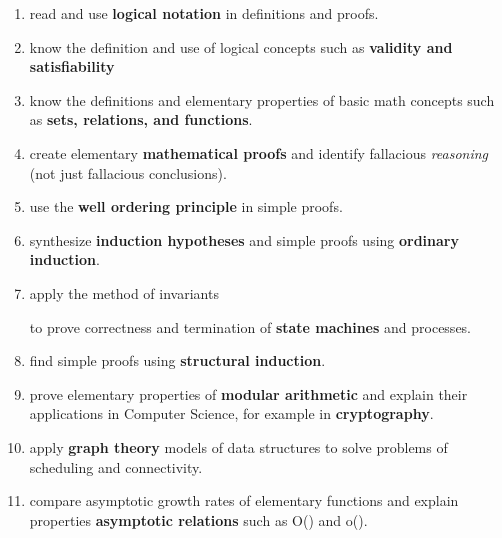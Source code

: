 \documentclass[handout]{mcs}
\begin{document}
\begin{enumerate}

\item \label{basic} read and use \textbf{logical notation} in
  definitions and proofs. \hfill \brule{0.5in}

\item \label{logic} know the definition and use of logical
  concepts such as \textbf{validity and satisfiability} \hfill \brule{0.5in}

\item \label{sets} know the definitions and elementary properties of
  basic math concepts such as \textbf{sets, relations, and
    functions}. \hfill \brule{0.5in}


\item \label{proofs} create elementary \textbf{mathematical
proofs} and identify fallacious \emph{reasoning} (not just fallacious
conclusions).  \hfill \brule{0.5in}

\item \label{well ordering principle} use the \textbf{well ordering
  principle} in simple proofs.  \hfill \brule{0.5in}

\item \label{induction} synthesize \textbf{induction hypotheses} and
  simple proofs using \textbf{ordinary induction}.  \hfill
  \brule{0.5in}

\item \label{invariants} apply the method of invariants
\iffalse and well-ordering\fi
to prove correctness and termination of \textbf{state
    machines} and processes.  \hfill \brule{0.5in}

\item \label{structural induction} find simple proofs using
  \textbf{structural induction}.  \hfill \brule{0.5in}

\item \label{arithmetic} prove elementary properties of \textbf{modular
arithmetic} and explain their applications in Computer Science,
for example in \textbf{cryptography}.\hfill \brule{0.5in}

\item \label{graphs} apply \textbf{graph theory} models of data
  structures to solve problems of scheduling and connectivity.  \hfill
  \brule{0.5in}

\item \label{asymptotics} compare asymptotic growth rates of
  elementary functions and explain properties \textbf{asymptotic
    relations} such as O() and o().


\end{enumerate}
\end{document}
